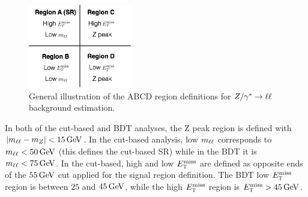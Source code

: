
\begin{figure}[h!]
  \centering
  \captionsetup{justification=centering}
  \includegraphics[width=0.4\textwidth]{figures/ABCD}
  \caption{General illustration of the ABCD region definitions for $Z/\gamma^{\ast}\to\ell\ell$ background estimation.}
  \label{fig:ABCDcuts}
\end{figure}

In both of the cut-based and BDT analyses, the Z peak region is defined with $|\mll - m_Z| < 15 \GeV$. In the cut-based analysis, low $m_{\ell\ell}$ corresponds to $\mll < 50 \GeV$ (this defines the cut-based SR) while in the BDT it is $\mll < 75 \GeV$. In the cut-based, high and low $E_{\textrm{\footnotesize\sc t}}^{\rm miss}$ are defined as opposite ends of the $55 \GeV$ cut applied for the signal region definition. The BDT low $E_{\textrm{\footnotesize\sc t}}^{\rm miss}$ region is between $25$ and $45 \GeV$, while the high $E_{\textrm{\footnotesize\sc t}}^{\rm miss}$ region is $\MET > 45 \GeV$. 

